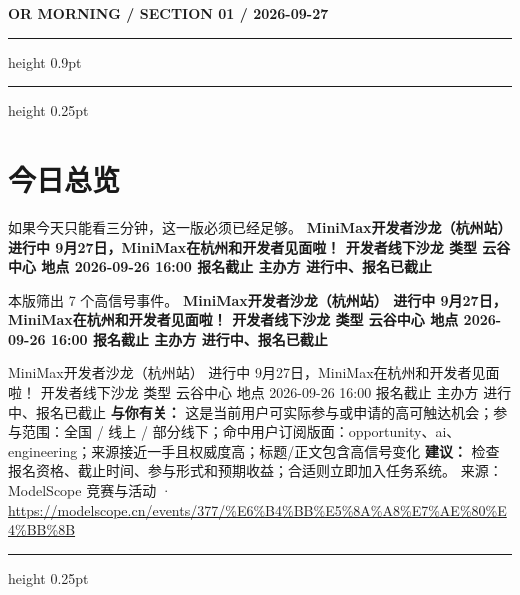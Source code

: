 \documentclass[10.5pt]{ctexart}
\begin{document}
{\small\bfseries OR MORNING / SECTION 01 / 2026-09-27}
\vspace{2mm}
\hrule height 0.9pt
\vspace{1.5mm}
\hrule height 0.25pt
\vspace{4mm}
\section*{今日总览}
{\color{ormuted} 如果今天只能看三分钟，这一版必须已经足够。}
\vspace{2mm}
{\fontsize{25}{29}\selectfont\bfseries MiniMax开发者沙龙（杭州站） 进行中 9月27日，MiniMax在杭州和开发者见面啦！ 开发者线下沙龙 类型 云谷中心 地点 2026-09-26 16:00 报名截止 主办方 进行中、报名已截止}\par
\vspace{2mm}
{\large 本版筛出 7 个高信号事件。}
\vspace{3mm}
{\Large\bfseries MiniMax开发者沙龙（杭州站） 进行中 9月27日，MiniMax在杭州和开发者见面啦！ 开发者线下沙龙 类型 云谷中心 地点 2026-09-26 16:00 报名截止 主办方 进行中、报名已截止}\par
MiniMax开发者沙龙（杭州站） 进行中 9月27日，MiniMax在杭州和开发者见面啦！ 开发者线下沙龙 类型 云谷中心 地点 2026-09-26 16:00 报名截止 主办方 进行中、报名已截止
\textbf{与你有关：} 这是当前用户可实际参与或申请的高可触达机会；参与范围：全国 / 线上 / 部分线下；命中用户订阅版面：opportunity、ai、engineering；来源接近一手且权威度高；标题/正文包含高信号变化
\textbf{建议：} 检查报名资格、截止时间、参与形式和预期收益；合适则立即加入任务系统。
{\footnotesize\color{ormuted} 来源：ModelScope 竞赛与活动 · \url{https://modelscope.cn/events/377/%E6%B4%BB%E5%8A%A8%E7%AE%80%E4%BB%8B}}
\vspace{3mm}
\hrule height 0.25pt
\vspace{3mm}
\end{document}
